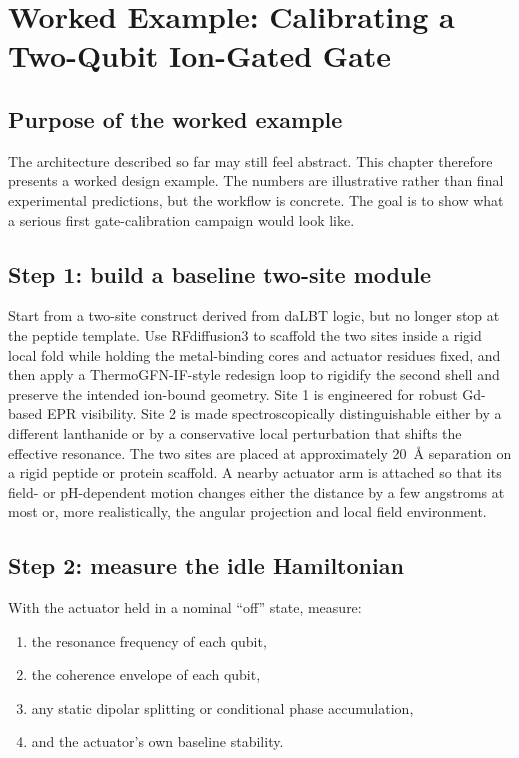 \documentclass[11pt]{report}
\newcommand{\dalbt}{daLBT}
\theoremstyle{definition}
\begin{document}
\chapter{Worked Example: Calibrating a Two-Qubit Ion-Gated Gate}

\section{Purpose of the worked example}
The architecture described so far may still feel abstract. This chapter therefore presents a worked design example. The numbers are illustrative rather than final experimental predictions, but the workflow is concrete. The goal is to show what a serious first gate-calibration campaign would look like.

\section{Step 1: build a baseline two-site module}
Start from a two-site construct derived from \dalbt{} logic, but no longer stop at the peptide template. Use RFdiffusion3 to scaffold the two sites inside a rigid local fold while holding the metal-binding cores and actuator residues fixed, and then apply a ThermoGFN-IF-style redesign loop to rigidify the second shell and preserve the intended ion-bound geometry. Site 1 is engineered for robust Gd-based EPR visibility. Site 2 is made spectroscopically distinguishable either by a different lanthanide or by a conservative local perturbation that shifts the effective resonance. The two sites are placed at approximately 20~\AA{} separation on a rigid peptide or protein scaffold. A nearby actuator arm is attached so that its field- or pH-dependent motion changes either the distance by a few angstroms at most or, more realistically, the angular projection and local field environment.

\section{Step 2: measure the idle Hamiltonian}
With the actuator held in a nominal ``off'' state, measure:

\begin{enumerate}[leftmargin=2em]
\item the resonance frequency of each qubit,
\item the coherence envelope of each qubit,
\item any static dipolar splitting or conditional phase accumulation,
\item and the actuator's own baseline stability.
\end{enumerate}
\end{document}
